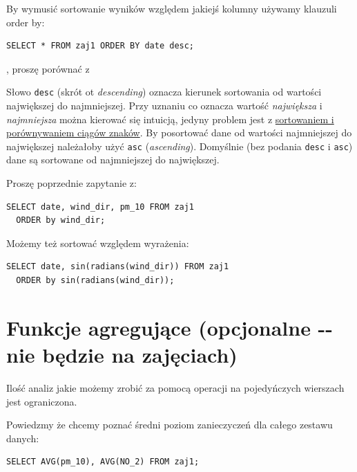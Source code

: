 \documentclass[a4paper]{article}
\begin{document}
By wymusić sortowanie wyników względem jakiejś kolumny używamy klauzuli
order by:

\begin{verbatim}
SELECT * FROM zaj1 ORDER BY date desc;
\end{verbatim}

, proszę porównać z

Słowo \texttt{desc} (skrót ot \emph{descending}) oznacza kierunek sortowania od wartości największej do najmniejszej.
Przy uznaniu co oznacza wartość \emph{największa} i \emph{najmniejsza} można kierować
się intuicją, jedyny problem jest z \href{https://www.google.com/search?q=postgresql+string+collation}{sortowaniem i porównywaniem ciągów znaków}.  By posortować
dane od wartości najmniejszej do największej należałoby użyć \texttt{asc} (\emph{ascending}).
Domyślnie (bez podania \texttt{desc} i \texttt{asc}) dane są sortowane od najmniejszej do
największej.

Proszę poprzednie zapytanie z:

\begin{verbatim}
SELECT date, wind_dir, pm_10 FROM zaj1
  ORDER by wind_dir;
\end{verbatim}


Możemy też sortować względem wyrażenia:

\begin{verbatim}
SELECT date, sin(radians(wind_dir)) FROM zaj1
  ORDER by sin(radians(wind_dir));
\end{verbatim}



\section{Funkcje agregujące (opcjonalne -{}- nie będzie na zajęciach)%
  \label{funkcje-agregujace-opcjonalne-nie-bedzie-na-zajeciach}%
}

Ilość analiz jakie możemy zrobić za pomocą operacji na pojedyńczych wierszach
jest ograniczona.

Powiedzmy że chcemy poznać średni poziom zanieczyczeń dla całego zestawu
danych:

\begin{verbatim}
SELECT AVG(pm_10), AVG(NO_2) FROM zaj1;
\end{verbatim}
\end{document}
